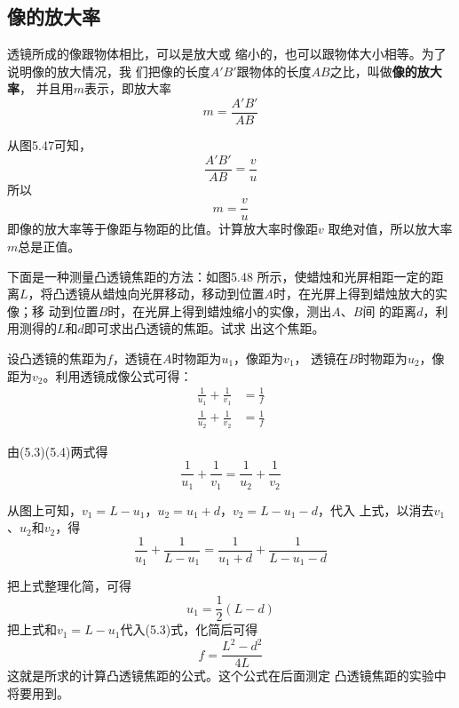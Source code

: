 \subsection{像的放大率}

透镜所成的像跟物体相比，可以是放大或
缩小的，也可以跟物体大小相等。为了说明像的放大情况，我
们把像的长度$A'B'$跟物体的长度$AB$之比，叫做\textbf{像的放大率}，
并且用$m$表示，即放大率
\[m=\frac{A'B'}{AB} \]

从图5.47可知，
\[\frac{A'B'}{AB}=\frac{v}{u} \]
所以
\[m=\frac{v}{u}\]
即像的放大率等于像距与物距的比值。计算放大率时像距$v$
取绝对值，所以放大率$m$总是正值。

\begin{example}
    下面是一种测量凸透镜焦距的方法：如图5.48
所示，使蜡烛和光屏相距一定的距离$L$，将凸透镜从蜡烛向光屏移动，移动到位置$A$时，在光屏上得到蜡烛放大的实像；移
动到位置$B$时，在光屏上得到蜡烛缩小的实像，测出$A$、$B$间
的距离$d$，利用测得的$L$和$d$即可求出凸透镜的焦距。试求
出这个焦距。
\end{example}

\begin{figure}[htp]
	\centering
{}
	\caption{}
\end{figure}

\begin{solution}
    设凸透镜的焦距为$f$，透镜在$A$时物距为$u_1$，像距为$v_1$，
    透镜在$B$时物距为$u_2$，像距为$v_2$。利用透镜成像公式可得：
   \begin{align}
\frac{1}{u_1}+\frac{1}{v_1}&=\frac{1}{f}\\
\frac{1}{u_2}+\frac{1}{v_2}&=\frac{1}{f}
   \end{align}
 
    由(5.3)(5.4)两式得
\[\frac{1}{u_1}+\frac{1}{v_1}=\frac{1}{u_2}+\frac{1}{v_2} \]
    
从图上可知，$v_1=L-u_1$，$u_2=u_1+d$，$v_2=L-u_1-d$，代入
    上式，以消去$v_1$、$u_2$和$v_2$，得
    \[\frac{1}{u_1}+\frac{1}{L-u_1}=\frac{1}{u_1+d}+\frac{1}{L-u_1-d} \]

    把上式整理化简，可得
\[u_1=\frac{1}{2}(L-d) \]
    把上式和$v_1=L-u_1$代入(5.3)式，化简后可得
\[f=\frac{L^2-d^2}{4L} \]
    这就是所求的计算凸透镜焦距的公式。这个公式在后面测定
    凸透镜焦距的实验中将要用到。
\end{solution}

